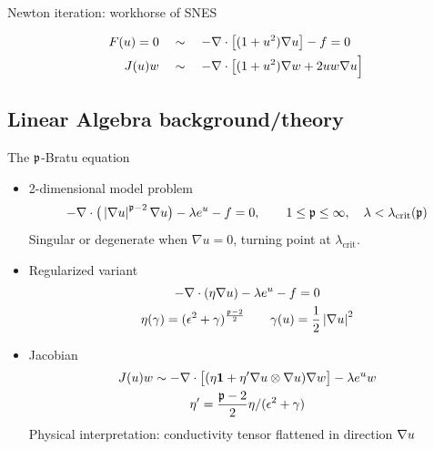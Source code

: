\begin{frame}{Newton iteration: workhorse of SNES}
\begin{example}
\begin{align*}
      F(u)=0 \quad &\sim\quad -\nabla \cdot \big[ (1+u^2) \nabla u \big] - f = 0 \\
      J(u)w \quad &\sim\quad  -\nabla \cdot \big[(1+u^2)\nabla w + 2uw\nabla u \Big]
    \end{align*}
  \end{example}
\end{frame}

\subsection{Linear Algebra background/theory}





\begin{frame}{The ${\mathfrak p}$-Bratu equation}
  \begin{itemize}
  \item 2-dimensional model problem
    \begin{equation*}
      -\nabla \cdot \big(\left\lvert \nabla u \right\rvert^{{\mathfrak p}-2} \nabla u \big) - \lambda e^u - f = 0, \qquad 1 \le {\mathfrak p} \le \infty, \quad \lambda < \lambda_{\text{crit}}({\mathfrak p})
    \end{equation*}
    Singular or degenerate when $\nabla u = 0$, turning point at $\lambda_{\text{crit}}$.
  \item Regularized variant
    \begin{gather*}
      -\nabla \cdot (\eta \nabla u) - \lambda e^u - f = 0 \\
      \eta(\gamma) = (\epsilon^2 + \gamma)^{\frac{{\mathfrak p}-2}{2}} \qquad \gamma(u) = {\frac 1 2} \left\lvert \nabla u \right\rvert^2
    \end{gather*}
  \item Jacobian
    \begin{gather*}
      J(u) w \sim -\nabla \cdot \big[ (\eta \bm 1 + \eta' \nabla u \otimes \nabla u) \nabla w \big] - \lambda e^u w \\
      \eta' = \frac{{\mathfrak p}-2}{2} \eta / (\epsilon^2 + \gamma)
    \end{gather*}
    Physical interpretation: conductivity tensor flattened in direction $\nabla u$ %
  \end{itemize}
\end{frame}

